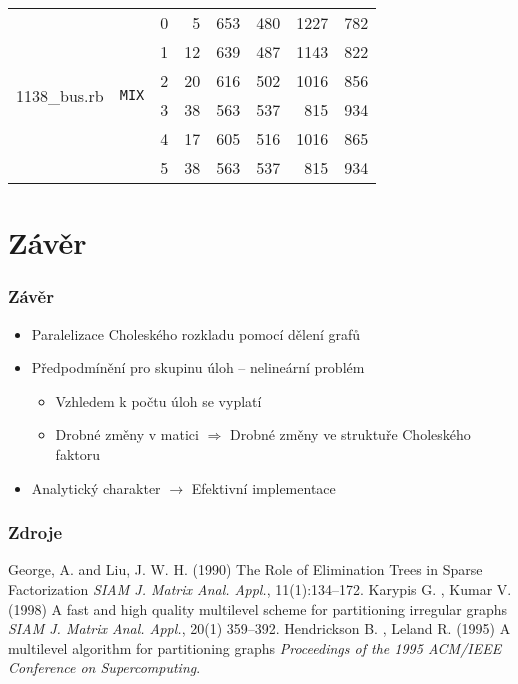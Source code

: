 \documentclass{beamer}
\begin{document}
\begin{frame}
\begin{itemize}
\begin{table}[ht]
\begin{tabular}{|l|c|c|r|r|r|r|r|}
        \hline
        \multirow{6}{*}{1138\_bus.rb}
        & \multirow{6}{*}{\texttt{MIX}} & 0 
        &	5	&	653	&	480	& 1227	&	782 \\
        & & 1 
        &	12	&	639	&	487	&	1143	&	822	\\
        & & 2
        &	20	&	616	&	502	&	1016	&	856	\\
        & & 3
        &	38	&	563	&	537	&	815	&	934	\\
        & & 4
        &	17	&	605	&	516	&	1016	&	865	\\
        & & 5
      	&	38	&	563	&	537	&	815	&	934	\\
      \hline
      \end{tabular}
    \end{table}
  \end{itemize}
\end{frame}

	\section*{Závěr}
\begin{frame}
    \frametitle{Závěr}
    \begin{itemize}
      \item Paralelizace Choleského rozkladu pomocí dělení grafů
      \medskip
      \item Předpodmínění pro skupinu úloh -- nelineární problém
      \medskip
      \begin{itemize}
        \item Vzhledem k počtu úloh se vyplatí
        \medskip
        \item Drobné změny v matici $\Rightarrow$ Drobné změny ve struktuře Choleského faktoru
      \end{itemize}
      \medskip
      \item Analytický charakter $\rightarrow$ Efektivní implementace
    \end{itemize}
\end{frame}

\begin{frame}
	\frametitle{Zdroje}
	\footnotesize{
	\begin{thebibliography}{99}
		\bibitem{} George, A. and Liu, J. W. H. (1990)
			\newblock The Role of Elimination Trees in Sparse Factorization
			\newblock \emph{SIAM J. Matrix Anal. Appl.}, 11(1):134--172.
    \bibitem{} Karypis G. , Kumar V. (1998)
			\newblock A fast and high quality multilevel scheme for partitioning irregular graphs
			\newblock \emph{SIAM J. Matrix Anal. Appl.}, 20(1) 359--392.
    \bibitem{} Hendrickson B. , Leland R. (1995)
			\newblock  A multilevel algorithm for partitioning graphs
			\newblock \emph{Proceedings of the 1995 ACM/IEEE Conference on Supercomputing}.
	\end{thebibliography}
	}
\end{frame}
\end{document}

